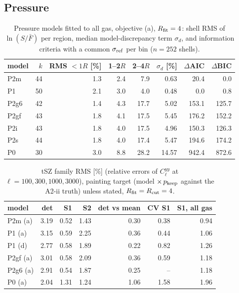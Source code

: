 \documentclass[10pt,a4paper]{article}
\begin{document}
\subsection{Pressure}
\begin{table}[H]
\centering
\footnotesize
\caption{Pressure models fitted to all gas, objective (a), $R_{\rm fit}=4$: shell RMS of $\ln(S/\bar F)$ per region, median model-discrepancy term $\sigma_d$, and information criteria with a common $\sigma_{\rm ref}$ per bin ($n=252$ shells).}
\label{tab:icP}
\begin{tabular}{lrrrrrrr}
\toprule
model & $k$ & RMS $<1R$ [\%] & 1--2$R$ & 2--4$R$ & $\sigma_d$ [\%] & $\Delta$AIC & $\Delta$BIC \\
\midrule
P2m & 44 & 1.3 & 2.4 & 7.9 & 0.63 & 20.4 & 0.0 \\
P1 & 50 & 2.1 & 3.0 & 4.0 & 0.48 & 0.0 & 0.8 \\
P2g6 & 42 & 1.4 & 4.3 & 17.7 & 5.02 & 153.1 & 125.7 \\
P2gf & 43 & 1.8 & 4.1 & 17.5 & 5.45 & 176.2 & 152.2 \\
P2i & 43 & 1.8 & 4.0 & 17.5 & 4.96 & 150.3 & 126.3 \\
P2s & 44 & 1.8 & 4.0 & 17.4 & 5.47 & 194.6 & 174.2 \\
P0 & 30 & 3.0 & 8.8 & 28.2 & 14.57 & 942.4 & 872.6 \\
\bottomrule
\end{tabular}
\end{table}
\begin{table}[H]
\centering
\footnotesize
\caption{tSZ family RMS [\%] (relative errors of $C_\ell^{yy}$ at $\ell=100,300,1000,3000$), painting target (model $\times\,p_{\rm keep}$ against the A2-ii truth) unless stated, $R_{\rm fit}=R_{\rm cut}=4$.}
\label{tab:obsP}
\begin{tabular}{lrrrrrr}
\toprule
model & det & S1 & S2 & det vs mean & CV S1 & S1, all gas \\
\midrule
P2m (a) & 3.19 & 0.52 & 1.43 & 0.30 & 0.38 & 0.94 \\
P1 (a) & 3.15 & 0.59 & 2.25 & 0.36 & 0.44 & 1.06 \\
P1 (d) & 2.77 & 0.58 & 1.89 & 0.22 & 0.82 & 1.26 \\
P2gf (a) & 3.01 & 0.58 & 2.09 & 0.36 & 0.59 & 1.18 \\
P2g6 (a) & 2.91 & 0.54 & 1.87 & 0.25 & -- & 1.18 \\
P0 (a) & 2.04 & 1.31 & 1.24 & 1.06 & 1.58 & 1.96 \\
\bottomrule
\end{tabular}
\end{table}
\end{document}
